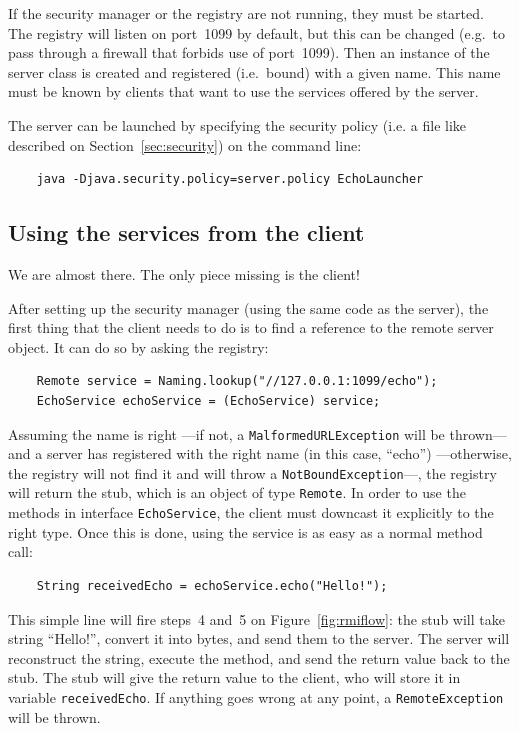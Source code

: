 If the security manager or the registry are not running, they must be
started. The registry will listen on port~1099 by default, but this
can be changed (e.g.~to pass through a firewall that forbids use of
port~1099). Then an instance of the server class is created and
registered (i.e.~bound) with a given name. This name must be known by
clients that want to use the services offered by the server.

The server can be launched by specifying the security policy (i.e. a
file like described on Section~\ref{sec:security}) on the
command line: 

\begin{verbatim}
    java -Djava.security.policy=server.policy EchoLauncher
\end{verbatim}

\subsection{Using the services from the client}
\label{sec:using-services-from}

We are almost there. The only piece missing is the client! 

After setting up the security manager (using the same code as the
server), the first thing that the client needs to do is to find a
reference to the remote server object. It can do so by asking the
registry:

\begin{verbatim}
    Remote service = Naming.lookup("//127.0.0.1:1099/echo"); 
    EchoService echoService = (EchoService) service;
\end{verbatim}

Assuming the name is right ---if not, a \verb+MalformedURLException+
will be thrown--- and a server has registered with the right name (in
this case, ``echo'') ---otherwise, the registry will not find it and
will throw a \verb+NotBoundException+---, the registry will return the
stub, which is an object of type \verb+Remote+. In order to use the
methods in interface \verb+EchoService+, the client must downcast it
explicitly to the right type. Once this is done, using the service is
as easy as a normal method call:

\begin{verbatim}
    String receivedEcho = echoService.echo("Hello!");
\end{verbatim}

This simple line will fire steps~4 and~5 
on Figure~\ref{fig:rmiflow}: the stub
will take string ``Hello!'', convert it into bytes, and send them to
the server. The server will reconstruct the string, execute the
method, and send the return value back to the stub. The stub will give
the return value to the client, who will store it in variable
\verb+receivedEcho+. If anything goes wrong at any point, a
\verb+RemoteException+ will be thrown. 

